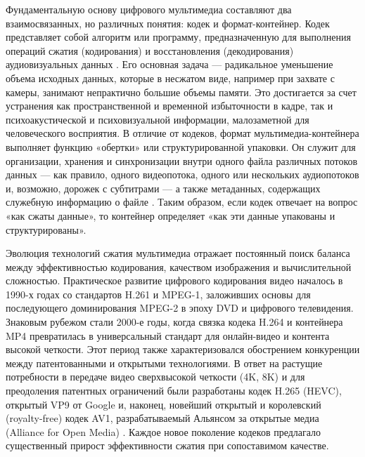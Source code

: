 \documentclass{SibFU-docs}
\begin{document}
Фундаментальную основу цифрового мультимедиа составляют два взаимосвязанных, но различных понятия: кодек и формат-контейнер. Кодек представляет собой алгоритм или программу, предназначенную для выполнения операций сжатия (кодирования) и восстановления (декодирования) аудиовизуальных данных \cite{richardson_video_codec_design}. Его основная задача — радикальное уменьшение объема исходных данных, которые в несжатом виде, например при захвате с камеры, занимают непрактично большие объемы памяти. Это достигается за счет устранения как пространственной и временной избыточности в кадре, так и психоакустической и психовизуальной информации, малозаметной для человеческого восприятия. В отличие от кодеков, формат мультимедиа-контейнера выполняет функцию «обертки» или структурированной упаковки. Он служит для организации, хранения и синхронизации внутри одного файла различных потоков данных — как правило, одного видеопотока, одного или нескольких аудиопотоков и, возможно, дорожек с субтитрами — а также метаданных, содержащих служебную информацию о файле \cite{richardson_overview_h264}. Таким образом, если кодек отвечает на вопрос «как сжаты данные», то контейнер определяет «как эти данные упакованы и структурированы».


Эволюция технологий сжатия мультимедиа отражает постоянный поиск баланса между эффективностью кодирования, качеством изображения и вычислительной сложностью. Практическое развитие цифрового кодирования видео началось в 1990-х годах со стандартов H.261 и MPEG-1, заложивших основы для последующего доминирования MPEG-2 в эпоху DVD и цифрового телевидения. Знаковым рубежом стали 2000-е годы, когда связка кодека H.264 и контейнера MP4 превратилась в универсальный стандарт для онлайн-видео и контента высокой четкости. Этот период также характеризовался обострением конкуренции между патентованными и открытыми технологиями. В ответ на растущие потребности в передаче видео сверхвысокой четкости (4K, 8K) и для преодоления патентных ограничений были разработаны кодек H.265 (HEVC), открытый VP9 от Google и, наконец, новейший открытый и королевский (royalty-free) кодек AV1, разрабатываемый Альянсом за открытые медиа (Alliance for Open Media) \cite{richardson_overview_h264}. Каждое новое поколение кодеков предлагало существенный прирост эффективности сжатия при сопоставимом качестве.

\end{document}
